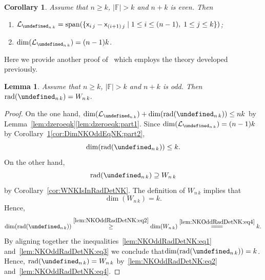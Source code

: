 \documentclass{elsarticle}
\let\det\undefined
\DeclareMathOperator{\det}{det}
\DeclareMathOperator{\Span}{span}
\DeclareMathOperator{\rad}{rad}
\def\F{{\mathbb F}}
\def\L{{\mathcal L}}
\newtheorem{lemma}[theorem]{Lemma}
\newtheorem{corollary}[theorem]{Corollary}
\theoremstyle{definition}
\numberwithin{equation}{section}
\begin{document}
\begin{corollary}\label{cor:DimNKOddEqNK}Assume that  $n \ge k$,  $|\F| > k$   and  $n + k$ is even. Then
\begin{enumerate}[label=(\alph*), ref=(\alph*)]
\item\label{cor:DimNKOddEqNK:part1} $\L_{\det_{n\,k}} = \Span (\{\mathsf x_{i\,j}  - \mathsf x_{(i+1)\,j} \mid 1 \le i \le (n-1),\; 1 \le j \le k \})$;
\item\label{cor:DimNKOddEqNK:part2} $\dim(\L_{\det_{n\,k}}) = (n-1)k$.
\end{enumerate}
\end{corollary}

Here we provide another proof of~\cite[Lemma~3.7]{Guterman2025b} which employs the theory developed previously.

\begin{lemma}\label{lem:NKOddRadDetNK}Assume that $n \ge k$,  $|\F| > k$  and $n + k$ is odd. Then\linebreak
$\rad(\det_{n\,k}) =  W_{n\,k}.$
\end{lemma}
\begin{proof}On the one hand, $\dim(\L_{\det_{n\,k}}) + \dim(\rad(\det_{n\,k})) \le nk$ by Lemma~\ref{lem:dzeroeqk}\ref{lem:dzeroeqk:part1}. Since $\dim(\L_{\det_{n\,k}}) = (n-1)k$ by Corollary~\ref{cor:DimNKOddEqNK}\ref{cor:DimNKOddEqNK:part2}, 
\begin{equation}\label{lem:NKOddRadDetNK:eq1}
\dim(\rad(\det_{n\,k})) \le k.
\end{equation}
On the other hand,
\begin{equation}\label{lem:NKOddRadDetNK:eq2}
\rad(\det_{n\,k}) \supseteq W_{n\,k}
\end{equation}
by Corollary~\ref{cor:WNKIsInRadDetNK}. The definition of $W_{n\,k}$ implies that
\begin{equation}\label{lem:NKOddRadDetNK:eq4}
\dim(W_{n\,k}) = k.
\end{equation}
Hence,
\begin{equation}\label{lem:NKOddRadDetNK:eq3}
\dim(\rad(\det_{n\,k})) \overset{\eqref{lem:NKOddRadDetNK:eq2}}{\ge} \dim(W_{n\,k}) \overset{\eqref{lem:NKOddRadDetNK:eq4}}{=\joinrel=\joinrel=} k.
\end{equation}
By aligning together the inequalities~\eqref{lem:NKOddRadDetNK:eq1} and~\eqref{lem:NKOddRadDetNK:eq3} we conclude that\linebreak $\dim(\rad(\det_{n\,k})) = k$. Hence, $\rad(\det_{n\,k}) = W_{n\,k}$ by~\eqref{lem:NKOddRadDetNK:eq2} and~\eqref{lem:NKOddRadDetNK:eq4}.
\end{proof}
\end{document}
